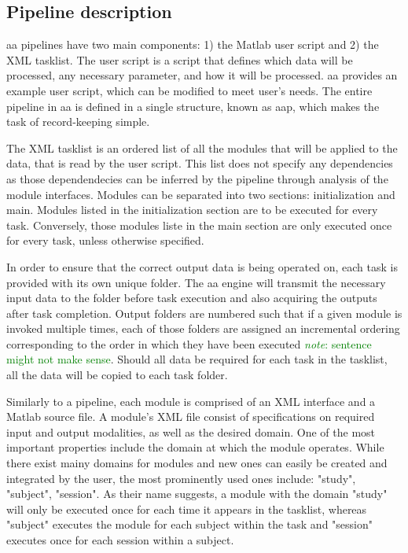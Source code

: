 \documentclass{report}
\newcommand{\note}[1]{\textcolor{green}{\textit{note}: #1}}
\begin{document}
        \subsection{Pipeline description}
        aa pipelines have two main components: 1) the Matlab user script and 2)
the XML tasklist. The user script is a script that defines which data will be
processed, any necessary parameter, and how it will be processed. aa provides an example user script,
which can be modified to meet user's needs. The entire pipeline in aa is defined
in a single structure, known as aap, which makes the task of record-keeping
simple.

        The XML tasklist is an ordered list of all the modules that will be applied to
the data, that is read by the user script. This list does not specify any
dependencies as those dependendecies can be inferred by the pipeline through
analysis of the module interfaces. Modules can be separated into two
sections: initialization and main. Modules listed in the initialization section
are to be executed for every task. Conversely, those modules liste in the main
section are only executed once for every task, unless otherwise specified.


        In order to ensure that the correct output data is being operated on,
each task is provided with its own unique folder. The aa engine will transmit
the necessary input data to the folder before task execution and also
acquiring the outputs after task completion. Output folders are numbered such
that if a given module is invoked multiple times, each of those folders are
assigned an incremental ordering corresponding to the order in which they have been
executed \note{sentence might not make sense}. Should all data be required for
each task in the tasklist, all the data will be copied to each task folder.


    Similarly to a pipeline, each module is comprised of an XML interface and a
Matlab source file. A module's XML file consist of specifications on required input
and output modalities, as well as the desired domain. One of the most important
properties include the domain at which the module operates. While there exist mainy domains for
modules and new ones can easily be created and integrated by the user, the most
prominently used ones include: "study", "subject", "session". As their name suggests, a
module with the domain "study" will only be executed once for each time it
appears in the tasklist, whereas "subject" executes the module for each subject
within the task and "session" executes once for each session within a subject. 
 
\end{document}
